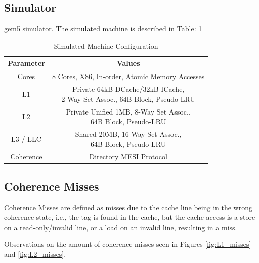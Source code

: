\subsection*{Simulator}

gem5 simulator. The simulated machine is described in Table: \ref{tab:machine_config}

\begin{table}[htbp]
\caption{Simulated Machine Configuration}
	\begin{center}
		\begin{tabular}{|c|c|}
			\hline

			\textbf{Parameter} & \textbf{Values}\\
			\hline

			Cores & 8 Cores, X86, In-order, Atomic Memory Accesses\\
			\hline

			L1 & \makecell{Private 64kB DCache/32kB ICache, \\ 2-Way Set Assoc., 64B Block, Pseudo-LRU}\\
			\hline

			L2 & \makecell{Private Unified 1MB, 8-Way Set Assoc., \\ 64B Block, Pseudo-LRU}\\
			\hline

			L3 / LLC & \makecell{Shared 20MB, 16-Way Set Assoc., \\ 64B Block, Pseudo-LRU}\\
			\hline

			Coherence & Directory MESI Protocol\\
			\hline

		\end{tabular}
	\label{tab:machine_config}
	\end{center}
\end{table}


\subsection*{Coherence Misses}

Coherence Misses are defined as misses due to the cache line being in the wrong coherence state, i.e., the tag is found in the cache, but the cache access is a store on a read-only/invalid line, or a load on an invalid line, resulting in a miss.

Observations on the amount of coherence misses seen in Figures \ref{fig:L1_misses} and \ref{fig:L2_misses}.

